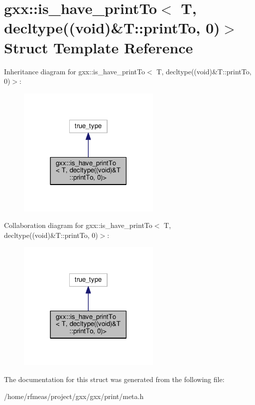 \hypertarget{structgxx_1_1is__have__printTo_3_01T_00_01decltype_07_07void_08_6T_1_1printTo_00_010_08_4}{}\section{gxx\+:\+:is\+\_\+have\+\_\+print\+To$<$ T, decltype((void)\&T\+:\+:print\+To, 0)$>$ Struct Template Reference}
\label{structgxx_1_1is__have__printTo_3_01T_00_01decltype_07_07void_08_6T_1_1printTo_00_010_08_4}


Inheritance diagram for gxx\+:\+:is\+\_\+have\+\_\+print\+To$<$ T, decltype((void)\&T\+:\+:print\+To, 0)$>$\+:
\nopagebreak
\begin{figure}[H]
\begin{center}
\leavevmode
\includegraphics[width=194pt]{structgxx_1_1is__have__printTo_3_01T_00_01decltype_07_07void_08_6T_1_1printTo_00_010_08_4__inherit__graph}
\end{center}
\end{figure}


Collaboration diagram for gxx\+:\+:is\+\_\+have\+\_\+print\+To$<$ T, decltype((void)\&T\+:\+:print\+To, 0)$>$\+:
\nopagebreak
\begin{figure}[H]
\begin{center}
\leavevmode
\includegraphics[width=194pt]{structgxx_1_1is__have__printTo_3_01T_00_01decltype_07_07void_08_6T_1_1printTo_00_010_08_4__coll__graph}
\end{center}
\end{figure}


The documentation for this struct was generated from the following file\+:\begin{DoxyCompactItemize}
\item 
/home/rfmeas/project/gxx/gxx/print/meta.\+h\end{DoxyCompactItemize}
